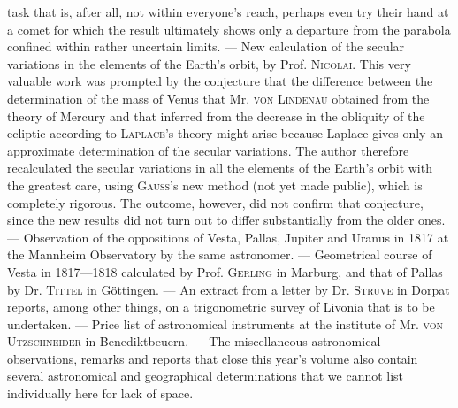 task that is, after all, not within everyone's reach, perhaps even try their hand at a comet for which the result ultimately shows only a departure from the parabola confined within rather uncertain limits. --- New calculation of the secular variations in the elements of the Earth's orbit, by Prof. \textsc{Nicolai}. This very valuable work was prompted by the conjecture that the difference between the determination of the mass of Venus that Mr. \textsc{von Lindenau} obtained from the theory of Mercury and that inferred from the decrease in the obliquity of the ecliptic according to \textsc{Laplace}'s theory might arise because Laplace gives only an approximate determination of the secular variations. The author therefore recalculated the secular variations in all the elements of the Earth's orbit with the greatest care, using \textsc{Gauss}'s new method (not yet made public), which is completely rigorous. The outcome, however, did not confirm that conjecture, since the new results did not turn out to differ substantially from the older ones. --- Observation of the oppositions of Vesta, Pallas, Jupiter and Uranus in 1817 at the Mannheim Observatory by the same astronomer. --- Geometrical course of Vesta in 1817---1818 calculated by Prof. \textsc{Gerling} in Marburg, and that of Pallas by Dr. \textsc{Tittel} in Göttingen. --- An extract from a letter by Dr. \textsc{Struve} in Dorpat reports, among other things, on a trigonometric survey of Livonia that is to be undertaken. --- Price list of astronomical instruments at the institute of Mr. \textsc{von Utzschneider} in Benediktbeuern. --- The miscellaneous astronomical observations, remarks and reports that close this year's volume also contain several astronomical and geographical determinations that we cannot list individually here for lack of space.
\par\clearpage\endgroup
